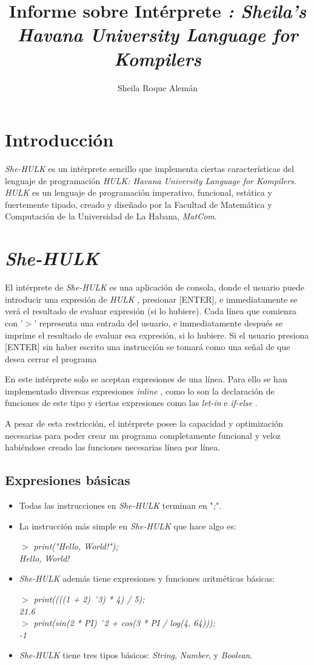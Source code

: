 \documentclass[12pt]{article}
\title{Informe sobre Intérprete \shehulk \emph{: Sheila's Havana University Language for Kompilers}}
\author{Sheila Roque Alemán}
\date{ }
\newcommand{\shehulk}{\emph{She-HULK} }
\newcommand{\hulk}{\emph{HULK} }
\newcommand{\ini}{$>$ }
\newcommand{\inline}{\textit{inline} }
\newcommand{\letin}{\textit{let-in} }
\newcommand{\ifelse}{\textit{if-else} }
\begin{document}
\maketitle

\section*{Introducción}
	\shehulk es un intérprete sencillo que implementa ciertas características del lenguaje de programación \emph{HULK: Havana University Language for Kompilers}.
	\emph{HULK} es un lenguaje de programación imperativo, funcional, estática y fuertemente tipado, creado y diseñado por la Facultad de Matemática y Computación de la Universidad de La Habana, \emph{MatCom}.
	
\section*{\shehulk}
	El intérprete de \shehulk es una aplicación de consola, donde el usuario puede introducir una expresión de \hulk, presionar [ENTER], e immediatamente se verá el resultado de evaluar expresión (si lo hubiere).
	Cada línea que comienza con '$>$' representa una entrada del usuario, e immediatamente después se imprime el resultado de evaluar esa expresión, si lo hubiere.
	Si el usuario presiona [ENTER] sin haber escrito una instrucción se tomará como una señal de que desea cerrar el programa

	En este intérprete solo se aceptan expresiones de una línea.
	Para ello se han implementado diversas expresiones \inline , como lo son la declaración de funciones de este tipo y ciertas expresiones como las \letin e \ifelse.
	
	A pesar de esta restricción, el intérprete posee la capacidad y optimización necesarias para poder crear un programa completamente funcional y veloz habiéndose creado las funciones necesarias línea por línea.
	
\subsection*{Expresiones básicas}
\begin{itemize}
	\item Todas las instrucciones en \shehulk terminan en "\textit{;}".
	\item La instrucción más simple en \shehulk que hace algo es:
	
	\emph{
	\ini print("Hello, World!"); \\
	Hello, World!
	}
	\item \shehulk además tiene expresiones y funciones aritméticas básicas:
	
	\emph{
	\ini print((((1 + 2) \^\ 3) * 4) / 5); \\
	21.6 \\
	\ini print(sin(2 * PI) \^\ 2 + cos(3 * PI / log(4, 64))); \\
	-1
	}
	\item \shehulk tiene tres tipos básicos: \emph{String}, \emph{Number}, y \emph{Boolean}.
\end{itemize}
\end{document}
